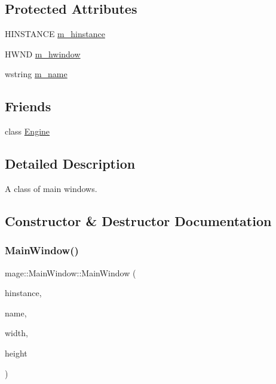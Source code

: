 \subsection*{Protected Attributes}
\begin{DoxyCompactItemize}
\item 
H\+I\+N\+S\+T\+A\+N\+CE \hyperlink{classmage_1_1_main_window_a389348c5949b2cb464a8236bfcff00ef}{m\+\_\+hinstance}
\item 
H\+W\+ND \hyperlink{classmage_1_1_main_window_afc9afabcf8a52d79f02c8352451863cc}{m\+\_\+hwindow}
\item 
wstring \hyperlink{classmage_1_1_main_window_a23d4e1b9499ab540b205af237710d783}{m\+\_\+name}
\end{DoxyCompactItemize}
\subsection*{Friends}
\begin{DoxyCompactItemize}
\item 
class \hyperlink{classmage_1_1_main_window_a3e1914489e4bed4f9f23cdeab34a43dc}{Engine}
\end{DoxyCompactItemize}


\subsection{Detailed Description}
A class of main windows. 

\subsection{Constructor \& Destructor Documentation}
\hypertarget{classmage_1_1_main_window_a245e387a79d5957c01c8e10cc083b346}{}\label{classmage_1_1_main_window_a245e387a79d5957c01c8e10cc083b346} 
\subsubsection{\texorpdfstring{Main\+Window()}{MainWindow()}}
{\footnotesize\ttfamily mage\+::\+Main\+Window\+::\+Main\+Window (\begin{DoxyParamCaption}\item[{H\+I\+N\+S\+T\+A\+N\+CE}]{hinstance,  }\item[{wstring}]{name,  }\item[{L\+O\+NG}]{width,  }\item[{L\+O\+NG}]{height }\end{DoxyParamCaption})\hspace{0.3cm}{\ttfamily [protected]}}

